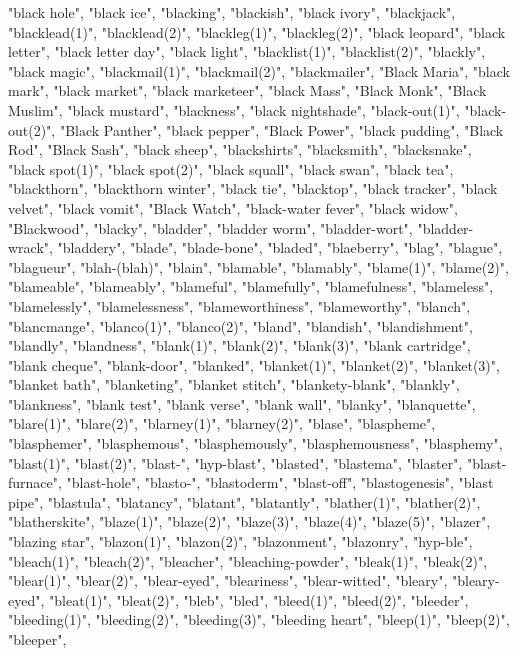 "black hole",
"black ice",
"blacking",
"blackish",
"black ivory",
"blackjack",
"blacklead(1)",
"blacklead(2)",
"blackleg(1)",
"blackleg(2)",
"black leopard",
"black letter",
"black letter day",
"black light",
"blacklist(1)",
"blacklist(2)",
"blackly",
"black magic",
"blackmail(1)",
"blackmail(2)",
"blackmailer",
"Black Maria",
"black mark",
"black market",
"black marketeer",
"black Mass",
"Black Monk",
"Black Muslim",
"black mustard",
"blackness",
"black nightshade",
"black-out(1)",
"black-out(2)",
"Black Panther",
"black pepper",
"Black Power",
"black pudding",
"Black Rod",
"Black Sash",
"black sheep",
"blackshirts",
"blacksmith",
"blacksnake",
"black spot(1)",
"black spot(2)",
"black squall",
"black swan",
"black tea",
"blackthorn",
"blackthorn winter",
"black tie",
"blacktop",
"black tracker",
"black velvet",
"black vomit",
"Black Watch",
"black-water fever",
"black widow",
"Blackwood",
"blacky",
"bladder",
"bladder worm",
"bladder-wort",
"bladder-wrack",
"bladdery",
"blade",
"blade-bone",
"bladed",
"blaeberry",
"blag",
"blague",
"blagueur",
"blah-(blah)",
"blain",
"blamable",
"blamably",
"blame(1)",
"blame(2)",
"blameable",
"blameably",
"blameful",
"blamefully",
"blamefulness",
"blameless",
"blamelessly",
"blamelessness",
"blameworthiness",
"blameworthy",
"blanch",
"blancmange",
"blanco(1)",
"blanco(2)",
"bland",
"blandish",
"blandishment",
"blandly",
"blandness",
"blank(1)",
"blank(2)",
"blank(3)",
"blank cartridge",
"blank cheque",
"blank-door",
"blanked",
"blanket(1)",
"blanket(2)",
"blanket(3)",
"blanket bath",
"blanketing",
"blanket stitch",
"blankety-blank",
"blankly",
"blankness",
"blank test",
"blank verse",
"blank wall",
"blanky",
"blanquette",
"blare(1)",
"blare(2)",
"blarney(1)",
"blarney(2)",
"blase",
"blaspheme",
"blasphemer",
"blasphemous",
"blasphemously",
"blasphemousness",
"blasphemy",
"blast(1)",
"blast(2)",
"blast-",
"hyp-blast",
"blasted",
"blastema",
"blaster",
"blast-furnace",
"blast-hole",
"blasto-",
"blastoderm",
"blast-off",
"blastogenesis",
"blast pipe",
"blastula",
"blatancy",
"blatant",
"blatantly",
"blather(1)",
"blather(2)",
"blatherskite",
"blaze(1)",
"blaze(2)",
"blaze(3)",
"blaze(4)",
"blaze(5)",
"blazer",
"blazing star",
"blazon(1)",
"blazon(2)",
"blazonment",
"blazonry",
"hyp-ble",
"bleach(1)",
"bleach(2)",
"bleacher",
"bleaching-powder",
"bleak(1)",
"bleak(2)",
"blear(1)",
"blear(2)",
"blear-eyed",
"bleariness",
"blear-witted",
"bleary",
"bleary-eyed",
"bleat(1)",
"bleat(2)",
"bleb",
"bled",
"bleed(1)",
"bleed(2)",
"bleeder",
"bleeding(1)",
"bleeding(2)",
"bleeding(3)",
"bleeding heart",
"bleep(1)",
"bleep(2)",
"bleeper",
